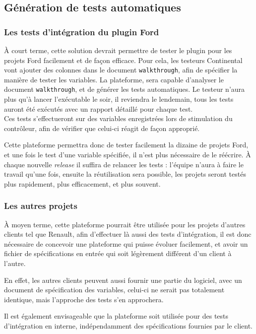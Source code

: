 	\subsection{Génération de tests automatiques}
	\subsubsection{Les tests d'intégration du plugin Ford}
	À court terme, cette solution devrait permettre de tester le plugin pour les projets Ford facilement et de façon efficace. Pour cela, les testeurs Continental vont ajouter des colonnes dans le document \texttt{walkthrough}, afin de spécifier la manière de tester les variables. La plateforme, sera capable d'analyser le document \texttt{walkthrough}, et de générer les tests automatiques. Le testeur n'aura plus qu'à lancer l'exécutable le soir, il reviendra le lendemain, tous les tests auront été exécutés avec un rapport détaillé pour chaque test.\\

	Ces tests s'effectueront sur des variables enregistrées lors de stimulation du contrôleur, afin de vérifier que celui-ci réagit de façon approprié.

	Cette plateforme permettra donc de tester facilement la dizaine de projets Ford, et une fois le test d'une variable spécifiée, il n'est plus nécessaire de le réécrire. À chaque nouvelle \textit{release} il suffira de relancer les tests : l'équipe n'aura à faire le travail qu'une fois, ensuite la réutilisation sera possible, les projets seront testés plus rapidement, plus efficacement, et plus souvent.

	\subsubsection{Les autres projets}
	À moyen terme, cette plateforme pourrait être utilisée pour les projets d'autres clients tel que Renault, afin d'effectuer là aussi des tests d'intégration, il est donc nécessaire de concevoir une plateforme qui puisse évoluer facilement, et avoir un fichier de spécifications en entrée qui soit légèrement différent d'un client à l'autre.

	En effet, les autres clients peuvent aussi fournir une partie du logiciel, avec un document de spécification des variables, celui-ci ne serait pas totalement identique, mais l'approche des tests s'en approchera.

	Il est également envisageable que la plateforme soit utilisée pour des tests d'intégration en interne, indépendamment des spécifications fournies par le client.

